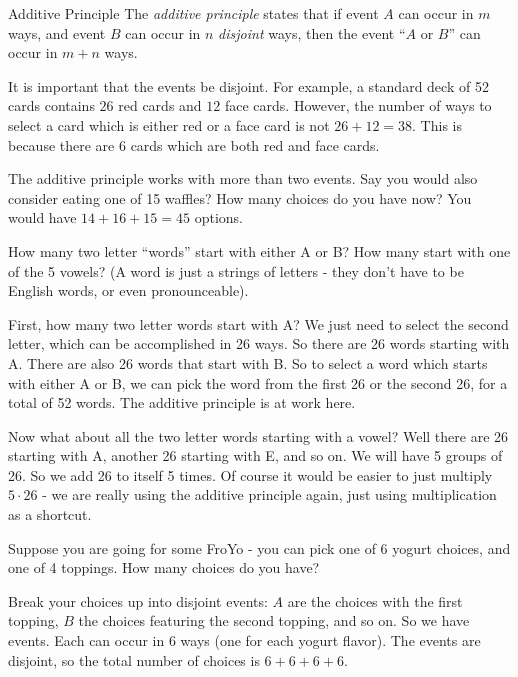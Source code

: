 \documentclass[12pt]{article}
\begin{document}
\begin{defbox}{Additive Principle}
  The {\em additive principle} states that if event $A$ can occur in $m$ ways, and event $B$ can occur in $n$ {\em disjoint} ways, then the event ``$A$ or $B$'' can occur in $m + n$ ways.  
\end{defbox}

It is important that the events be disjoint.  For example, a standard deck of 52 cards contains $26$ red cards and $12$ face cards.  However, the number of ways to select a card which is either red or a face card is not $26 + 12 = 38$.  This is because there are 6 cards which are both red and face cards.

The additive principle works with more than two events.  Say you would also consider eating one of 15 waffles?  How many choices do you have now?  You would have $14 + 16 + 15 = 45$ options.

\begin{example}
  How many two letter ``words'' start with either A or B?  How many start with one of the 5 vowels?  (A word is just a strings of letters - they don't have to be English words, or even pronounceable).
  
  \begin{solution}
    First, how many two letter words start with A?  We just need to select the second letter, which can be accomplished in 26 ways.  So there are 26 words starting with A.  There are also 26 words that start with B.  So to select a word which starts with either A or B, we can pick the word from the first 26 or the second 26, for a total of 52 words.  The additive principle is at work here.
    
    Now what about all the two letter words starting with a vowel?  Well there are 26 starting with A, another 26 starting with E, and so on.  We will have 5 groups of 26.  So we add 26 to itself 5 times.  Of course it would be easier to just multiply $5\cdot 26$ - we are really using the additive principle again, just using multiplication as a shortcut.
  \end{solution}

\end{example}

\begin{example}
  Suppose you are going for some FroYo - you can pick one of 6 yogurt choices, and one of 4 toppings.  How many choices do you have?  
  
  \begin{solution}
    Break your choices up into disjoint events:  $A$ are the choices with the first topping, $B$ the choices featuring the second topping, and so on.  So we have events.  Each can occur in 6 ways (one for each yogurt flavor).  The events are disjoint, so the total number of choices is $6 + 6 + 6 + 6$.
  \end{solution}


\end{example}
\end{document}
